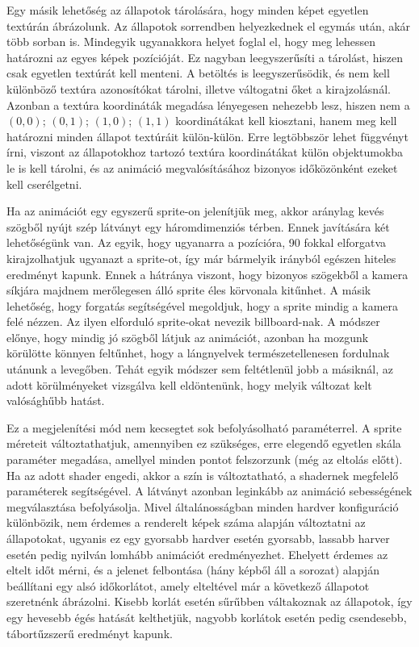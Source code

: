 Egy másik lehetőség az állapotok tárolására, hogy minden képet egyetlen textúrán ábrázolunk. Az állapotok sorrendben helyezkednek el egymás után, akár több sorban is. Mindegyik ugyanakkora helyet foglal el, hogy meg lehessen határozni az egyes képek pozícióját. Ez nagyban leegyszerűsíti a tárolást, hiszen csak egyetlen textúrát kell menteni. A betöltés is leegyszerűsödik, és nem kell különböző textúra azonosítókat tárolni, illetve váltogatni őket a kirajzolásnál. Azonban a textúra koordináták megadása lényegesen nehezebb lesz, hiszen nem a $(0, 0)$; $(0, 1)$; $(1, 0)$; $(1, 1)$ koordinátákat kell kiosztani, hanem meg kell határozni minden állapot textúráit külön-külön. Erre legtöbbször lehet függvényt írni, viszont az állapotokhoz tartozó textúra koordinátákat külön objektumokba le is kell tárolni, és az animáció megvalósításához bizonyos időközönként ezeket kell cserélgetni.

Ha az animációt egy egyszerű sprite-on jelenítjük meg, akkor aránylag kevés szögből nyújt szép látványt egy háromdimenziós térben. Ennek javítására két lehetőségünk van. Az egyik, hogy ugyanarra a pozícióra, 90 fokkal elforgatva kirajzolhatjuk ugyanazt a sprite-ot, így már bármelyik irányból egészen hiteles eredményt kapunk. Ennek a hátránya viszont, hogy bizonyos szögekből a kamera síkjára majdnem merőlegesen álló sprite éles körvonala kitűnhet. A másik lehetőség, hogy forgatás segítségével megoldjuk, hogy a sprite mindig a kamera felé nézzen. Az ilyen elforduló sprite-okat nevezik billboard-nak. A módszer előnye, hogy mindig jó szögből látjuk az animációt, azonban ha mozgunk körülötte könnyen feltűnhet, hogy a lángnyelvek természetellenesen fordulnak utánunk a levegőben. Tehát egyik módszer sem feltétlenül jobb a másiknál, az adott körülményeket vizsgálva kell eldöntenünk, hogy melyik változat kelt valósághűbb hatást.

Ez a megjelenítési mód nem kecsegtet sok befolyásolható paraméterrel. A sprite méreteit változtathatjuk, amennyiben ez szükséges, erre elegendő egyetlen skála paraméter megadása, amellyel minden pontot felszorzunk (még az eltolás előtt). Ha az adott shader engedi, akkor a szín is változtatható, a shadernek megfelelő paraméterek segítségével. A látványt azonban leginkább az animáció sebességének megválasztása befolyásolja. Mivel általánosságban minden hardver konfiguráció különbözik, nem érdemes a renderelt képek száma alapján változtatni az állapotokat, ugyanis ez egy gyorsabb hardver esetén gyorsabb, lassabb harver esetén pedig nyilván lomhább animációt eredményezhet. Ehelyett érdemes az eltelt időt mérni, és a jelenet felbontása (hány képből áll a sorozat) alapján beállítani egy alsó időkorlátot, amely elteltével már a következő állapotot szeretnénk ábrázolni. Kisebb korlát esetén sűrűbben váltakoznak az állapotok, így egy hevesebb égés hatását kelthetjük, nagyobb korlátok esetén pedig csendesebb, tábortűzszerű eredményt kapunk.

